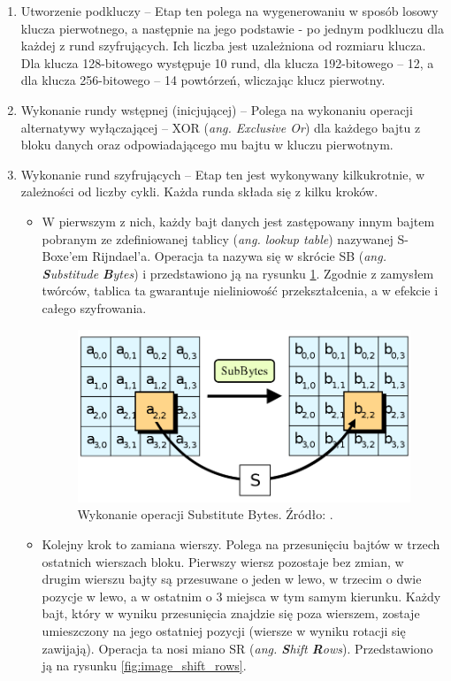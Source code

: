 \begin{enumerate}
\item  Utworzenie podkluczy – Etap ten polega na wygenerowaniu w sposób losowy klucza pierwotnego, a następnie na jego podstawie - po jednym podkluczu dla każdej z rund szyfrujących. Ich liczba jest uzależniona od rozmiaru klucza. Dla klucza 128-bitowego występuje 10 rund, dla klucza 192-bitowego – 12, a dla klucza 256-bitowego – 14 powtórzeń, wliczając klucz pierwotny.

\item Wykonanie rundy wstępnej (inicjującej) – Polega na wykonaniu operacji alternatywy wyłączającej – XOR (\textit{ang. Exclusive Or}) dla każdego bajtu z bloku danych oraz odpowiadającego mu bajtu w kluczu pierwotnym.

\item Wykonanie rund szyfrujących – Etap ten jest wykonywany kilkukrotnie, w zależności od liczby cykli. Każda runda składa się z kilku kroków. 

	\begin{itemize}
	\item W pierwszym z nich, każdy bajt danych jest zastępowany innym bajtem pobranym ze zdefiniowanej tablicy (\textit{ang. lookup table}) nazywanej S-Boxe’em Rijndael’a. Operacja ta nazywa się w skrócie SB (\textit{ang. \textbf{S}ubstitude \textbf{B}ytes}) i przedstawiono ją na rysunku \ref{fig:image_substitute_bytes}. Zgodnie z zamysłem twórców, tablica ta gwarantuje nieliniowość przekształcenia, a w efekcie i całego szyfrowania.
	
	\begin{figure}[h]
		\centering
		\includegraphics[width=10cm]{img/com_security/800px-AES-SubBytes.png}
		\caption{Wykonanie operacji Substitute Bytes. Źródło: \cite{aes_wiki}.}
		\label{fig:image_substitute_bytes}
	\end{figure}

	\item  Kolejny krok to zamiana wierszy. Polega na przesunięciu bajtów w trzech ostatnich wierszach bloku. Pierwszy wiersz pozostaje bez zmian, w drugim wierszu bajty są przesuwane o jeden w lewo, w trzecim o dwie pozycje w lewo, a w ostatnim o 3 miejsca w tym samym kierunku. Każdy bajt, który w wyniku przesunięcia znajdzie się poza wierszem, zostaje umieszczony na jego ostatniej pozycji (wiersze w wyniku rotacji się zawijają). Operacja ta nosi miano SR (\textit{ang. \textbf{S}hift \textbf{R}ows}). Przedstawiono ją na rysunku \ref{fig:image_shift_rows}.
	

\end{itemize}
\end{enumerate}
